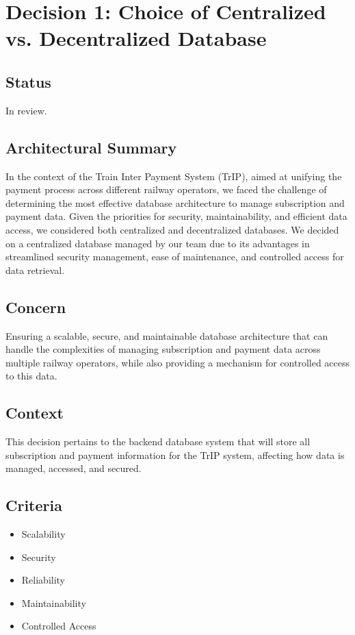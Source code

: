 \section*{Decision 1: Choice of Centralized vs. Decentralized Database}

\subsection*{Status}
In review.

\subsection*{Architectural Summary}
In the context of the Train Inter Payment System (TrIP), aimed at unifying the payment process across different railway operators, we faced the challenge of determining the most effective database architecture to manage subscription and payment data. Given the priorities for security, maintainability, and efficient data access, we considered both centralized and decentralized databases. We decided on a centralized database managed by our team due to its advantages in streamlined security management, ease of maintenance, and controlled access for data retrieval.

\subsection*{Concern}
Ensuring a scalable, secure, and maintainable database architecture that can handle the complexities of managing subscription and payment data across multiple railway operators, while also providing a mechanism for controlled access to this data.

\subsection*{Context}
This decision pertains to the backend database system that will store all subscription and payment information for the TrIP system, affecting how data is managed, accessed, and secured.

\subsection*{Criteria}
\begin{itemize}
    \item Scalability
    \item Security
    \item Reliability
    \item Maintainability
    \item Controlled Access
\end{itemize}

